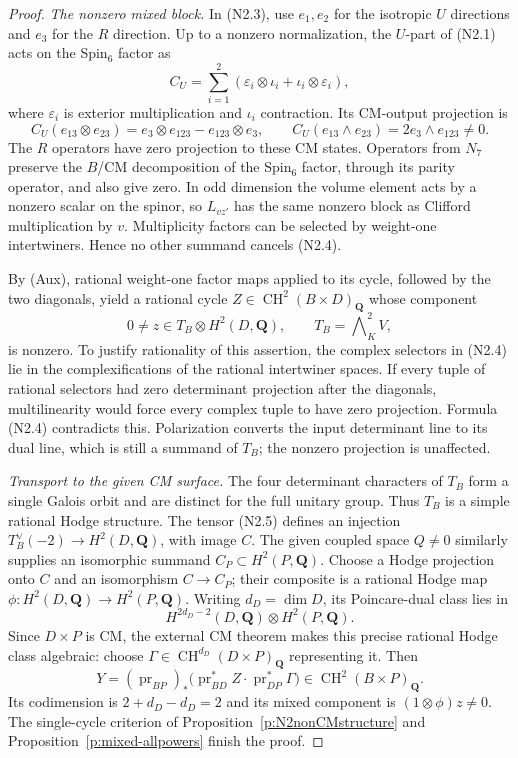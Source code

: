 \documentclass[10pt,reqno]{article}
\theoremstyle{emphasizedplain}
\theoremstyle{emphasizeddefinition}
\theoremstyle{emphasizeddefinition}
\DeclareMathOperator{\CH}{CH}
\newcommand{\Q}{\mathbf Q}
\begin{document}
\begin{proof}
\emph{The nonzero mixed block.}
In (N2.3), use $e_1,e_2$ for the isotropic $U$ directions and
$e_3$ for the $R$ direction. Up to a nonzero normalization, the
$U$-part of (N2.1) acts on the Spin$_6$ factor as
\[
 C_U=\sum_{i=1}^2(\varepsilon_i\otimes\iota_i+
                         \iota_i\otimes\varepsilon_i),
\]
where $\varepsilon_i$ is exterior multiplication and $\iota_i$
contraction. Its CM-output projection is
\[
 C_U(e_{13}\otimes e_{23})
       =e_3\otimes e_{123}-e_{123}\otimes e_3,
 \qquad
 C_U(e_{13}\wedge e_{23})=2e_3\wedge e_{123}\ne0.
                                                        \tag{N2.4}
\]
The $R$ operators have zero projection to these CM states.
Operators from $N_7$ preserve the $B$/CM decomposition of the
Spin$_6$ factor, through its parity operator, and also give zero.
In odd dimension the volume element acts by a nonzero scalar on
the spinor, so $L_{vz'}$ has the same nonzero block as Clifford
multiplication by $v$. Multiplicity factors can be selected by
weight-one intertwiners. Hence no other summand cancels (N2.4).

By (Aux), rational weight-one factor maps applied to its cycle,
followed by the two diagonals, yield a rational cycle
$Z\in\CH^2(B\times D)_\Q$ whose component
\[
       0\ne z\in T_B\otimes H^2(D,\Q),\qquad
       T_B=\bigwedge\nolimits_K^2V,                     \tag{N2.5}
\]
is nonzero. To justify rationality of this assertion, the complex
selectors in (N2.4) lie in the complexifications of the rational
intertwiner spaces. If every tuple of rational selectors had
zero determinant projection after the diagonals, multilinearity
would force every complex tuple to have zero projection.
Formula (N2.4) contradicts this. Polarization converts the input
determinant line to its dual line, which is still a summand of
$T_B$; the nonzero projection is unaffected.

\emph{Transport to the given CM surface.}
The four determinant characters of $T_B$ form a single Galois
orbit and are distinct for the full unitary group. Thus $T_B$
is a simple rational Hodge structure. The tensor (N2.5) defines
an injection $T_B^\vee(-2)\to H^2(D,\Q)$, with image $C$.
The given coupled space $Q\ne0$ similarly supplies an isomorphic
summand $C_P\subset H^2(P,\Q)$.
Choose a Hodge projection onto $C$ and an isomorphism $C\to C_P$;
their composite is a rational Hodge map
$\phi:H^2(D,\Q)\to H^2(P,\Q)$.
Writing $d_D=\dim D$, its Poincare-dual class lies in
\[
 H^{2d_D-2}(D,\Q)\otimes H^2(P,\Q).
 \tag{N2.6}
\]
Since $D\times P$ is CM, the external CM theorem makes this
precise rational Hodge class algebraic:
choose $\Gamma\in\CH^{d_D}(D\times P)_\Q$ representing it.
Then
\[
 Y=(\operatorname{pr}_{BP})_*
   \bigl(\operatorname{pr}_{BD}^*Z\cdot
         \operatorname{pr}_{DP}^*\Gamma\bigr)
       \in\CH^2(B\times P)_\Q.
\]
Its codimension is $2+d_D-d_D=2$ and its mixed component is
$(1\otimes\phi)z\ne0$. The single-cycle criterion of
Proposition~\ref{p:N2nonCMstructure} and
Proposition~\ref{p:mixed-allpowers} finish the proof.
\end{proof}
\end{document}
